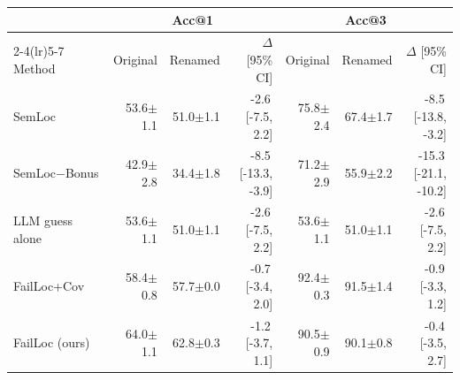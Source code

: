\begin{tabular}{lrrrrrr}
\toprule
 & \multicolumn{3}{c}{Acc@1} & \multicolumn{3}{c}{Acc@3} \\
\cmidrule(lr){2-4}\cmidrule(lr){5-7}
Method & Original & Renamed & $\Delta$ [95\% CI] & Original & Renamed & $\Delta$ [95\% CI] \\
\midrule
SemLoc & 53.6{\scriptsize$\pm$1.1} & 51.0{\scriptsize$\pm$1.1} & -2.6{\scriptsize\,[-7.5, 2.2]} & 75.8{\scriptsize$\pm$2.4} & 67.4{\scriptsize$\pm$1.7} & -8.5{\scriptsize\,[-13.8, -3.2]} \\
SemLoc−Bonus & 42.9{\scriptsize$\pm$2.8} & 34.4{\scriptsize$\pm$1.8} & -8.5{\scriptsize\,[-13.3, -3.9]} & 71.2{\scriptsize$\pm$2.9} & 55.9{\scriptsize$\pm$2.2} & -15.3{\scriptsize\,[-21.1, -10.2]} \\
LLM guess alone & 53.6{\scriptsize$\pm$1.1} & 51.0{\scriptsize$\pm$1.1} & -2.6{\scriptsize\,[-7.5, 2.2]} & 53.6{\scriptsize$\pm$1.1} & 51.0{\scriptsize$\pm$1.1} & -2.6{\scriptsize\,[-7.5, 2.2]} \\
FailLoc+Cov & 58.4{\scriptsize$\pm$0.8} & 57.7{\scriptsize$\pm$0.0} & -0.7{\scriptsize\,[-3.4, 2.0]} & 92.4{\scriptsize$\pm$0.3} & 91.5{\scriptsize$\pm$1.4} & -0.9{\scriptsize\,[-3.3, 1.2]} \\
FailLoc (ours) & 64.0{\scriptsize$\pm$1.1} & 62.8{\scriptsize$\pm$0.3} & -1.2{\scriptsize\,[-3.7, 1.1]} & 90.5{\scriptsize$\pm$0.9} & 90.1{\scriptsize$\pm$0.8} & -0.4{\scriptsize\,[-3.5, 2.7]} \\
\bottomrule
\end{tabular}
